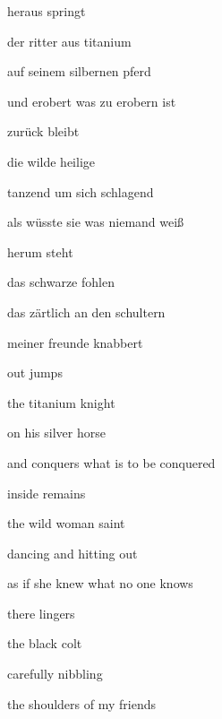 \documentclass[a4paper]{article}
\begin{document}
\bigskip



\bigskip

heraus springt

der ritter aus titanium

auf seinem silbernen pferd


\bigskip

und erobert was zu erobern ist


\bigskip

zurück bleibt

die wilde heilige

tanzend um sich schlagend


\bigskip

als wüsste sie was niemand weiß


\bigskip

herum steht

das schwarze fohlen

das zärtlich an den schultern


\bigskip

meiner freunde knabbert


\bigskip


\bigskip



\bigskip

out jumps

the titanium knight

on his silver horse


\bigskip

and conquers what is to be conquered


\bigskip

inside remains

the wild woman saint

dancing and hitting out 


\bigskip

as if she knew what no one knows


\bigskip

there lingers

the black colt

carefully nibbling 


\bigskip

the shoulders of my friends


\bigskip



\bigskip
\end{document}
